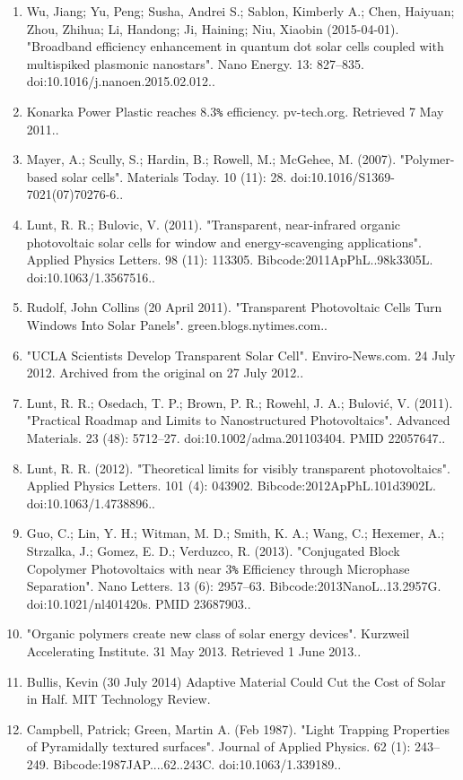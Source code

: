 \begin{enumerate}
\item Wu, Jiang; Yu, Peng; Susha, Andrei S.; Sablon, Kimberly A.; Chen, Haiyuan; Zhou, Zhihua; Li, Handong; Ji, Haining; Niu, Xiaobin (2015-04-01). "Broadband efficiency enhancement in quantum dot solar cells coupled with multispiked plasmonic nanostars". Nano Energy. 13: 827–835. doi:10.1016/j.nanoen.2015.02.012..
\item Konarka Power Plastic reaches 8.3\verb`%` efficiency. pv-tech.org. Retrieved 7 May 2011..
\item Mayer, A.; Scully, S.; Hardin, B.; Rowell, M.; McGehee, M. (2007). "Polymer-based solar cells". Materials Today. 10 (11): 28. doi:10.1016/S1369-7021(07)70276-6..
\item Lunt, R. R.; Bulovic, V. (2011). "Transparent, near-infrared organic photovoltaic solar cells for window and energy-scavenging applications". Applied Physics Letters. 98 (11): 113305. Bibcode:2011ApPhL..98k3305L. doi:10.1063/1.3567516..
\item Rudolf, John Collins (20 April 2011). "Transparent Photovoltaic Cells Turn Windows Into Solar Panels". green.blogs.nytimes.com..
\item "UCLA Scientists Develop Transparent Solar Cell". Enviro-News.com. 24 July 2012. Archived from the original on 27 July 2012..
\item Lunt, R. R.; Osedach, T. P.; Brown, P. R.; Rowehl, J. A.; Bulović, V. (2011). "Practical Roadmap and Limits to Nanostructured Photovoltaics". Advanced Materials. 23 (48): 5712–27. doi:10.1002/adma.201103404. PMID 22057647..
\item Lunt, R. R. (2012). "Theoretical limits for visibly transparent photovoltaics". Applied Physics Letters. 101 (4): 043902. Bibcode:2012ApPhL.101d3902L. doi:10.1063/1.4738896..
\item Guo, C.; Lin, Y. H.; Witman, M. D.; Smith, K. A.; Wang, C.; Hexemer, A.; Strzalka, J.; Gomez, E. D.; Verduzco, R. (2013). "Conjugated Block Copolymer Photovoltaics with near 3\verb`%` Efficiency through Microphase Separation". Nano Letters. 13 (6): 2957–63. Bibcode:2013NanoL..13.2957G. doi:10.1021/nl401420s. PMID 23687903..
\item "Organic polymers create new class of solar energy devices". Kurzweil Accelerating Institute. 31 May 2013. Retrieved 1 June 2013..
\item Bullis, Kevin (30 July 2014) Adaptive Material Could Cut the Cost of Solar in Half. MIT Technology Review.
\item Campbell, Patrick; Green, Martin A. (Feb 1987). "Light Trapping Properties of Pyramidally textured surfaces". Journal of Applied Physics. 62 (1): 243–249. Bibcode:1987JAP....62..243C. doi:10.1063/1.339189..

\end{enumerate}
